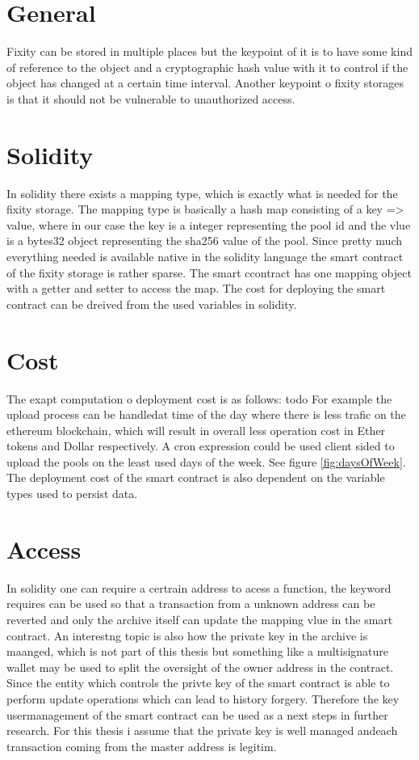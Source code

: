 \section{General}
Fixity can be stored in multiple places but the keypoint of it is to have some kind of reference to the object and a cryptographic hash value with it to control if the object has changed at a certain time interval. Another keypoint o fixity storages is that it should not be vulnerable to unauthorized access.
\section{Solidity}
In solidity there exists a mapping type, which is exactly what is needed for the fixity storage. The mapping type is basically a hash map consisting of a key => value, where in our case the key is a integer representing the pool id and the vlue is a bytes32 object representing the sha256 value of the pool. Since pretty much everything needed is available native in the solidity language the smart contract of the fixity storage is rather sparse. The smart ccontract has one mapping object with a getter and setter to access the map. The cost for deploying the smart contract can be dreived from the used variables in solidity. 
\section{Cost}
The exapt computation o deployment cost is as follows: todo
For example the upload process can be handledat time of the day where there is less trafic on the ethereum blockchain, which will result in overall  less operation cost in Ether tokens and Dollar respectively. A cron expression could be used client sided to upload the pools on the least used days of the week. See figure \ref{fig:daysOfWeek}.
The deployment cost of the smart contract is also dependent on the variable types used to persist data.
\section{Access}
In solidity one can require a certrain address to acess a function, the keyword requires can be used  so that a transaction from a unknown address can be reverted and only the archive itself can update the mapping vlue in the smart contract. An interestng topic is also how the private key in the archive is maanged, which is not part of this thesis but something like a multisignature wallet may be used to split the oversight of the owner address in the contract. Since the entity which controls the privte key of the smart contract is able to perform update operations which can lead to history forgery. Therefore the key usermanagement of the smart contract can be used as a next steps in further research. For this thesis i assume that the private key is well managed andeach transaction coming from the master address is legitim.

